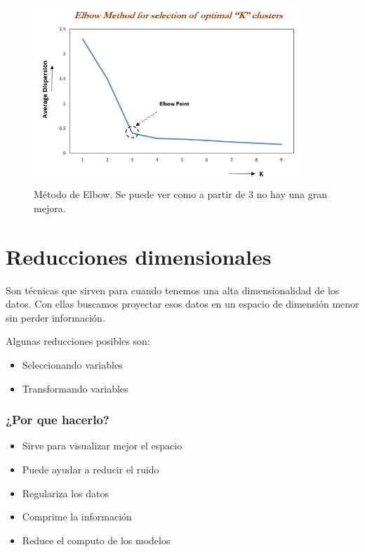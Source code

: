 \documentclass[titlepage,a4paper]{article}
\begin{document}
\begin{figure}[!htb]
    \centering
    \includegraphics[width=0.9\textwidth]{imagenesResumen/ElbowMethod.png}
    \caption{Método de Elbow. Se puede ver como a partir de 3 no hay una gran mejora.}
\end{figure}

\section{Reducciones dimensionales}

Son técnicas que sirven para cuando tenemos una alta dimensionalidad de los datos. Con ellas buscamos proyectar esos datos en un espacio de dimensión menor sin perder información. 

Algunas reducciones posibles son:
\begin{itemize}
    \item Seleccionando variables
    \item Transformando variables
\end{itemize}

\subsubsection*{¿Por que hacerlo?}

\begin{itemize}
    \item Sirve para visualizar mejor el espacio
    \item Puede ayudar a reducir el ruido
    \item Regulariza los datos
    \item Comprime la información
    \item Reduce el computo de los modelos
\end{itemize}
\end{document}
